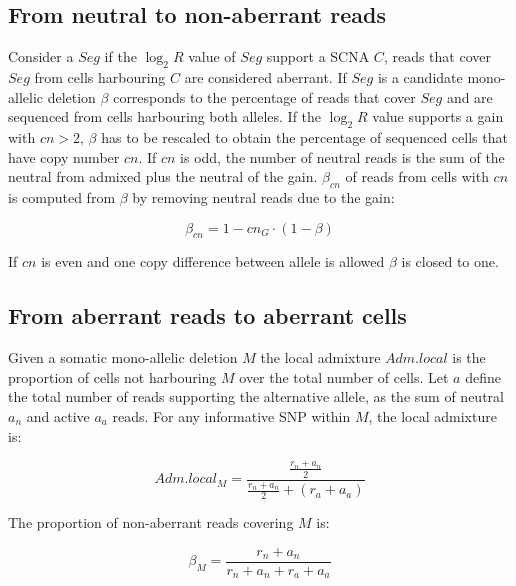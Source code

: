 	\subsection{From neutral to non-aberrant reads}
	Consider a $Seg$ if the $\log_2 R$ value of $Seg$ support a SCNA $C$, reads that cover $Seg$ from cells harbouring $C$ are considered aberrant.
	If $Seg$ is a candidate mono-allelic deletion $\beta$ corresponds to the percentage of reads that cover $Seg$ and are sequenced from cells harbouring both alleles.
	If the $\log_2 R$ value supports a gain with $cn >2$, $\beta$ has to be rescaled to obtain the percentage of sequenced cells that have copy number $cn$.
	If $cn$ is odd, the number of neutral reads is the sum of the neutral from admixed plus the neutral of the gain.
	$\beta_{cn}$ of reads from cells with $cn$ is computed from $\beta$ by removing neutral reads due to the gain:

	$$\beta_{cn} = 1 - cn_{G}\cdot (1-\beta)$$

	If $cn$ is even and one copy difference between allele is allowed $\beta$ is closed to one.

	\subsection{From aberrant reads to aberrant cells}
	Given a somatic mono-allelic deletion $M$ the local admixture $Adm.local$ is the proportion of cells not harbouring $M$ over the total number of cells.
	Let $a$ define the total number of reads supporting the alternative allele, as the sum of neutral $a_n$ and active $a_a$ reads.
	For any informative SNP within $M$, the local admixture is:

	$$Adm.local_M = \frac{\frac{r_n+a_n}{2}}{\frac{r_n+a_n}{2}+(r_a+a_a)}$$

	The proportion of non-aberrant reads covering $M$ is:

	$$\beta_M = \frac{r_n+a_n}{r_n+a_n+r_a+a_a}$$

